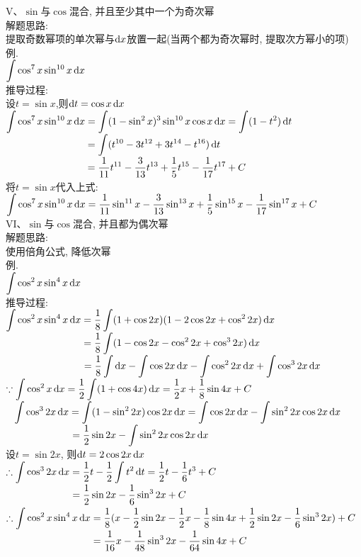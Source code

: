 V、$\sin$与$\cos$混合, 并且至少其中一个为奇次幂\\
解题思路:\\
提取奇数幂项的单次幂与$\mathop{}\!\mathrm{d} x$放置一起(当两个都为奇次幂时, 提取次方幂小的项)\\
例.\\
\phantom{例}$\displaystyle\int\cos^7x\sin^{10}x\mathop{}\!\mathrm{d} x$\\
推导过程:\\
设$t=\sin x$,则$\mathop{}\!\mathrm{d} t=\cos x\mathop{}\!\mathrm{d} x$\\
$\displaystyle\int\cos^7x\sin^{10}x\mathop{}\!\mathrm{d} x=\int(1-\sin^2x)^3\sin^{10}x\cos x\mathop{}\!\mathrm{d} x=\int(1-t^2)\mathop{}\!\mathrm{d} t$\\
$\displaystyle\phantom{\int\cos^7x\sin^{10}x\dif x}=\int(t^{10}-3t^{12}+3t^{14}-t^{16})\dif t$\\
$\displaystyle\phantom{\int\cos^7x\sin^{10}x\dif x}=\frac{1}{11}t^{11}-\frac{3}{13}t^{13}+\frac{1}{5}t^{15}-\frac{1}{17}t^{17}+C$\\
将$t=\sin x$代入上式:\\
$\displaystyle\int\cos^7x\sin^{10}x\mathop{}\!\mathrm{d} x=\frac{1}{11}\sin^{11}x-\frac{3}{13}\sin^{13}x+\frac{1}{5}\sin^{15}x-\frac{1}{17}\sin^{17}x+C$\\

VI、$\sin$与$\cos$混合, 并且都为偶次幂\\
解题思路:\\
使用倍角公式, 降低次幂\\
例.\\
\phantom{例}$\displaystyle\int\cos^2x\sin^4x\mathop{}\!\mathrm{d} x$\\
推导过程:\\
$\displaystyle\int\cos^2x\sin^4x\mathop{}\!\mathrm{d} x=\frac{1}{8}\int(1+\cos2x)(1-2\cos2x+\cos^22x)\mathop{}\!\mathrm{d} x$\\
$\displaystyle\phantom{\int\cos^2x\sin^4x\dif x}=\frac{1}{8}\int(1-\cos2x-\cos^22x+\cos^32x)\dif x$\\
$\displaystyle\phantom{\int\cos^2x\sin^4x\dif x}=\frac{1}{8}\int\dif x-\int\cos2x\dif x-\int\cos^22x\dif x+\int\cos^32x\dif x$\\
$\displaystyle\because\int\cos^2x\mathop{}\!\mathrm{d} x=\frac{1}{2}\int(1+\cos4x)\mathop{}\!\mathrm{d} x=\frac{1}{2}x+\frac{1}{8}\sin4x+C$\\
$\displaystyle\phantom{\because}\int\cos^32x\mathop{}\!\mathrm{d} x=\int(1-\sin^22x)\cos2x\mathop{}\!\mathrm{d} x=\int\cos2x\mathop{}\!\mathrm{d} x-\int\sin^22x\cos2x\mathop{}\!\mathrm{d} x$\\
$\displaystyle\phantom{\because\int\cos^32x\dif x}=\frac{1}{2}\sin2x-\int\sin^22x\cos2x\dif x$\\
\phantom{$\displaystyle\because$}设$t=\sin2x$, 则$\mathop{}\!\mathrm{d} t=2\cos2x\mathop{}\!\mathrm{d} x$\\
$\displaystyle\therefore\int\cos^32x\mathop{}\!\mathrm{d} x=\frac{1}{2}t-\frac{1}{2}\int t^2\mathop{}\!\mathrm{d} t=\frac{1}{2}t-\frac{1}{6}t^3+C$\\
$\displaystyle\phantom{\therefore\int\cos^32x\dif x}=\frac{1}{2}\sin2x-\frac{1}{6}\sin^32x+C$\\
$\displaystyle\therefore\int\cos^2x\sin^4x\mathop{}\!\mathrm{d} x=\frac{1}{8}(x-\frac{1}{2}\sin2x-\frac{1}{2}x-\frac{1}{8}\sin4x+\frac{1}{2}\sin2x-\frac{1}{6}\sin^32x)+C$\\
$\displaystyle\phantom{\therefore\int\cos^2x\sin^4x\dif x}=\frac{1}{16}x-\frac{1}{48}\sin^32x-\frac{1}{64}\sin4x+C$\\

